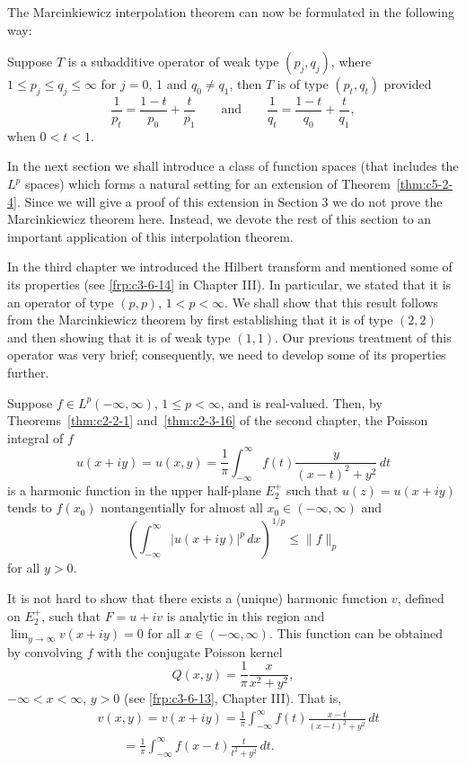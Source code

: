 The Marcinkiewicz interpolation theorem can now be formulated in the following
way:

\begin{theorem}\label{thm:c5-2-4}
Suppose $T$ is a subadditive operator of weak type $(p_{j}, q_{j})$, where
$1 \leq p_{j} \leq q_{j} \leq \infty$ for $j = 0$, 1 and $q_{0} \neq q_{1}$,
then $T$ is of type $(p_{t}, q_{t})$ provided
\[
\frac{1}{p_{t}}=\frac{1-t}{p_{0}}+\frac{t}{p_{1}}
\qquad\text{and}\qquad
\frac{1}{q_{t}}=\frac{1-t}{q_{0}}+\frac{t}{q_{1}},
\]
when $0 < t < 1$.
\end{theorem}

In the next section we shall introduce a class of function spaces (that
includes the $L^{p}$ spaces) which forms a natural setting for an extension of
Theorem~\ref{thm:c5-2-4}. Since we will give a proof of this extension in
Section 3 we do not prove the Marcinkiewicz theorem here. Instead, we devote
the rest of this section to an important application of this interpolation
theorem.

In the third chapter we introduced the Hilbert transform and mentioned some of
its properties (see \eqref{frp:c3-6-14} in Chapter III). In particular, we
stated that it is an operator of type $(p, p)$, $1 < p < \infty$. We shall show
that this result follows from the Marcinkiewicz theorem by first establishing
that it is of type $(2, 2)$ and then showing that it is of weak type $(1, 1)$.
Our previous treatment of this operator was very brief; consequently, we need
to develop some of its properties further.

Suppose $f \in L^{p}(-\infty, \infty)$, $1 \leq p < \infty$, and is
real-valued. Then, by Theorems~\ref{thm:c2-2-1} and~\ref{thm:c2-3-16} of the
second chapter, the Poisson integral of $f$
\[
u(x+iy)=u(x,y)=\frac{1}{\pi}\int_{-\infty}^{\infty}f(t)
\frac{y}{(x-t)^{2}+y^{2}}\,dt
\]
is a harmonic function in the upper half-plane $E_{2}^{+}$ such that
$u(z) = u(x + iy)$ tends to $f(x_{0})$ nontangentially for almost all
$x_{0} \in (-\infty, \infty)$ and
\begin{equation}\label{eq:c5-2-5}
\left(\int_{-\infty}^{\infty}|u(x+iy)|^{p}\,dx\right)^{1/p}\leq\|f\|_{p}
\end{equation}
for all $y > 0$.

It is not hard to show that there exists a (unique) harmonic function $v$,
defined on $E_{2}^{+}$, such that $F = u + iv$ is analytic in this region and
$\lim_{y \to \infty}v(x + iy) = 0$ for all $x \in (-\infty, \infty)$. This
function can be obtained by convolving $f$ with the conjugate Poisson kernel
\[
Q(x,y)=\frac{1}{\pi}\frac{x}{x^{2}+y^{2}},
\]
$-\infty < x < \infty$, $y > 0$ (see \eqref{frp:c3-6-13}, Chapter III). That is,
\[
\begin{aligned}&v(x,y)=v(x+iy)=\frac{1}{\pi}\int_{-\infty}^{\infty}f(t)
\frac{x-t}{(x-t)^{2}+y^{2}}\,dt\\
&\qquad=\frac{1}{\pi}\int_{-\infty}^{\infty}f(x-t)\frac{t}{t^{2}+y^{2}}\,dt.\end{aligned}
\]

